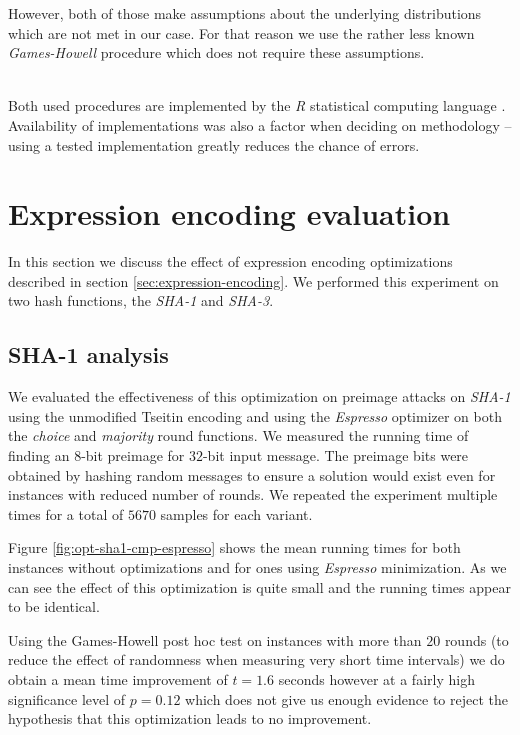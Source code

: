However, both of those make assumptions about the underlying distributions which are not met in our case.
For that reason we use the rather less known \emph{Games-Howell} procedure \cite{games1976pairwise} which does not require these assumptions.

~\\

Both used procedures are implemented by the \emph{R} statistical computing language \cite{rteam2013}.
Availability of implementations was also a factor when deciding on methodology -- using a tested implementation greatly reduces the chance of errors.

\section{Expression encoding evaluation}
\label{sec:expression-encoding-eval}
In this section we discuss the effect of expression encoding optimizations described in section \ref{sec:expression-encoding}.
We performed this experiment on two hash functions, the \emph{SHA-1} and \emph{SHA-3}.

\subsection{SHA-1 analysis}
We evaluated the effectiveness of this optimization on preimage attacks on \emph{SHA-1} using the unmodified Tseitin encoding and using the \emph{Espresso} optimizer on both the \emph{choice} and \emph{majority} round functions.
We measured the running time of finding an $8$-bit preimage for $32$-bit input message.
The preimage bits were obtained by hashing random messages to ensure a solution would exist even for instances with reduced number of rounds.
We repeated the experiment multiple times for a total of $5670$ samples for each variant.
 
Figure \ref{fig:opt-sha1-cmp-espresso} shows the mean running times for both instances without optimizations and for ones using \emph{Espresso} minimization.
As we can see the effect of this optimization is quite small and the running times appear to be identical.

%

Using the Games-Howell post hoc test on instances with more than $20$ rounds (to reduce the effect of randomness when measuring very short time intervals) we do obtain a mean time improvement of $t=1.6$ seconds however at a fairly high significance level of $p=0.12$ which does not give us enough evidence to reject the hypothesis that this optimization leads to no improvement.

